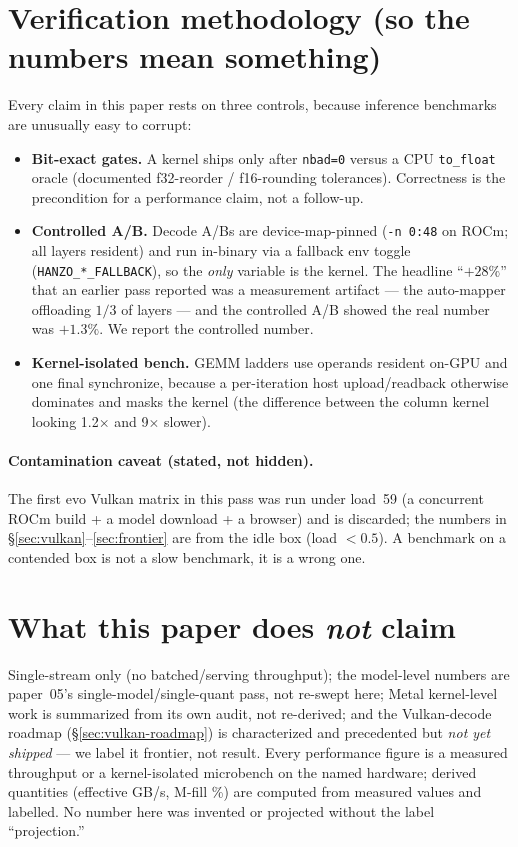 \documentclass[11pt]{article}
\newcommand{\x}{\ensuremath{\times}}
\begin{document}
\section{Verification methodology (so the numbers mean something)}
\label{sec:method}
Every claim in this paper rests on three controls, because inference benchmarks are unusually easy
to corrupt:
\begin{itemize}[noitemsep]
  \item \textbf{Bit-exact gates.} A kernel ships only after \texttt{nbad=0} versus a CPU
        \texttt{to\_float} oracle (documented f32-reorder / f16-rounding tolerances). Correctness is
        the precondition for a performance claim, not a follow-up.
  \item \textbf{Controlled A/B.} Decode A/Bs are device-map-pinned (\texttt{-n 0:48} on ROCm; all
        layers resident) and run in-binary via a fallback env toggle (\texttt{HANZO\_*\_FALLBACK}),
        so the \emph{only} variable is the kernel. The headline ``$+28\%$'' that an earlier pass
        reported was a measurement artifact --- the auto-mapper offloading $1/3$ of layers --- and
        the controlled A/B showed the real number was $+1.3\%$. We report the controlled number.
  \item \textbf{Kernel-isolated bench.} GEMM ladders use operands resident on-GPU and one final
        synchronize, because a per-iteration host upload/readback otherwise dominates and masks the
        kernel (the difference between the column kernel looking 1.2\x{} and 9\x{} slower).
\end{itemize}
\paragraph{Contamination caveat (stated, not hidden).} The first evo Vulkan matrix in this pass was
run under load~59 (a concurrent ROCm build + a model download + a browser) and is discarded; the
numbers in \S\ref{sec:vulkan}--\ref{sec:frontier} are from the idle box (load $<0.5$). A benchmark
on a contended box is not a slow benchmark, it is a wrong one.

\section{What this paper does \emph{not} claim}
Single-stream only (no batched/serving throughput); the model-level numbers are paper~05's
single-model/single-quant pass, not re-swept here; Metal kernel-level work is summarized from its
own audit, not re-derived; and the Vulkan-decode roadmap (\S\ref{sec:vulkan-roadmap}) is
characterized and precedented but \emph{not yet shipped} --- we label it frontier, not result. Every
performance figure is a measured throughput or a kernel-isolated microbench on the named hardware;
derived quantities (effective GB/s, M-fill \%) are computed from measured values and labelled. No
number here was invented or projected without the label ``projection.''
\end{document}
